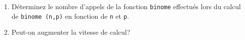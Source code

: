   \begin{enumerate}

    \item Déterminez le nombre d'appels de la fonction \texttt{binome}
          effectués lors du calcul de \texttt{binome (n,p)} en
          fonction de \texttt{n} et \texttt{p}.

    \item Peut-on augmenter la vitesse de calcul?

  \end{enumerate}
